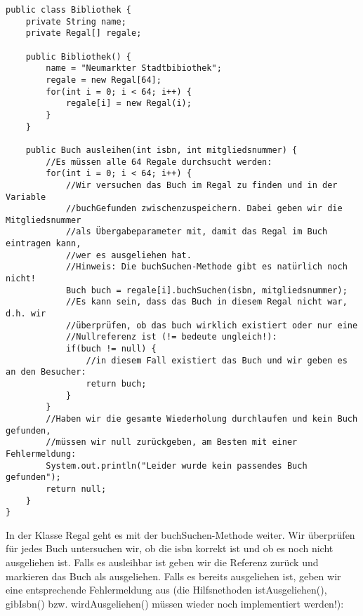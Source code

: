 \documentclass{article}
\begin{document}
\begin{verbatim}
public class Bibliothek {
    private String name;
    private Regal[] regale;

    public Bibliothek() {
        name = "Neumarkter Stadtbibiothek";
        regale = new Regal[64];
        for(int i = 0; i < 64; i++) {
            regale[i] = new Regal(i);
        }
    }

    public Buch ausleihen(int isbn, int mitgliedsnummer) {
        //Es müssen alle 64 Regale durchsucht werden:
        for(int i = 0; i < 64; i++) {
            //Wir versuchen das Buch im Regal zu finden und in der Variable
            //buchGefunden zwischenzuspeichern. Dabei geben wir die Mitgliedsnummer
            //als Übergabeparameter mit, damit das Regal im Buch eintragen kann,
            //wer es ausgeliehen hat.
            //Hinweis: Die buchSuchen-Methode gibt es natürlich noch nicht!
            Buch buch = regale[i].buchSuchen(isbn, mitgliedsnummer);
            //Es kann sein, dass das Buch in diesem Regal nicht war, d.h. wir 
            //überprüfen, ob das buch wirklich existiert oder nur eine
            //Nullreferenz ist (!= bedeute ungleich!):
            if(buch != null) {
                //in diesem Fall existiert das Buch und wir geben es an den Besucher:
                return buch;
            }
        }
        //Haben wir die gesamte Wiederholung durchlaufen und kein Buch gefunden,
        //müssen wir null zurückgeben, am Besten mit einer Fehlermeldung:
        System.out.println("Leider wurde kein passendes Buch gefunden");
        return null;
    }
}
\end{verbatim}
In der Klasse Regal geht es mit der buchSuchen-Methode weiter. Wir überprüfen für jedes Buch untersuchen wir, ob die isbn korrekt ist und ob es noch nicht ausgeliehen ist. Falls es ausleihbar ist geben wir die Referenz zurück und markieren das Buch als ausgeliehen. Falls es bereits ausgeliehen ist, geben wir eine entsprechende Fehlermeldung aus (die Hilfsnethoden istAusgeliehen(), gibIsbn() bzw. wirdAusgeliehen() müssen wieder noch implementiert werden!):
\end{document}
